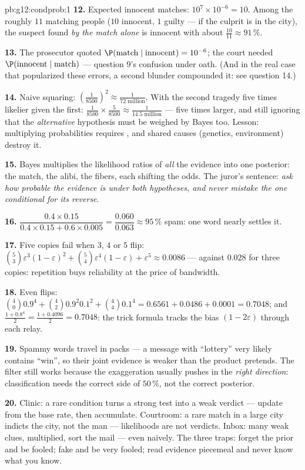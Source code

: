\begin{solution}{pb:g12:condprob:1}
\textbf{12.} Expected innocent matches:
$10^7 \times 10^{-6} = 10$. Among the roughly $11$ matching
people ($10$ innocent, $1$ guilty --- if the culprit is in
the city), the suspect found \emph{by the match alone} is
innocent with  about $\frac{10}{11} \approx
91\,\%$.

\textbf{13.} The prosecutor quoted
$\P(\text{match} \mid \text{innocent}) = 10^{-6}$; the court
needed $\P(\text{innocent} \mid \text{match})$ --- question
9's confusion under oath. (And in the real case that
popularized these errors, a second blunder compounded it:
see question 14.)

\textbf{14.} Naive squaring: $\left(\frac{1}{8500}\right)^2
\approx \frac{1}{72 \text{ million}}$. With the second
tragedy five times likelier given the first:
$\frac{1}{8500} \times \frac{5}{8500} \approx
\frac{1}{14.5 \text{ million}}$ --- five times larger, and
still ignoring that the \emph{alternative} hypothesis must be
weighed by Bayes too. Lesson: multiplying probabilities
requires , and shared causes (genetics,
environment) destroy it.

\textbf{15.} Bayes multiplies the likelihood ratios of
\emph{all} the evidence into one posterior: the match, the
alibi, the fibers, each shifting the odds. The juror's
sentence: \emph{ask how probable the evidence is under both
hypotheses, and never mistake the one conditional for its
reverse}.

\textbf{16.} $\dfrac{0.4 \times 0.15}{0.4 \times 0.15 +
0.6 \times 0.005} = \dfrac{0.060}{0.063} \approx 95\,\%$
spam: one word nearly settles it.

\textbf{17.} Five copies fail when $3$, $4$ or $5$ flip:
$\binom53 \varepsilon^3(1-\varepsilon)^2 + \binom54
\varepsilon^4 (1 - \varepsilon) + \varepsilon^5 \approx
0.0086$ --- against $0.028$ for three copies: repetition
buys reliability at the price of bandwidth.

\textbf{18.} Even flips: $\binom40 0.9^4 + \binom42 0.9^2
0.1^2 + \binom44 0.1^4 = 0.6561 + 0.0486 + 0.0001 = 0.7048$;
and $\frac{1 + 0.8^4}{2} = \frac{1 + 0.4096}{2} = 0.7048$:
the trick formula tracks the bias $(1 - 2\varepsilon)$
through each relay.

\textbf{19.} Spammy words travel in packs --- a message with
``lottery'' very likely contains ``win'', so their joint
evidence is weaker than the product pretends. The filter
still works because the exaggeration usually pushes in the
\emph{right direction}: classification needs the correct side
of $50\,\%$, not the correct posterior.

\textbf{20.} Clinic: a rare condition turns a strong test
into a weak verdict --- update from the base rate, then
accumulate. Courtroom: a rare match in a large city indicts
the city, not the man --- likelihoods are not verdicts.
Inbox: many weak clues, multiplied, sort the mail --- even
naively. The three traps: forget the prior and be fooled;
fake  and be very fooled; read evidence piecemeal
and never know what you know.
\end{solution}

